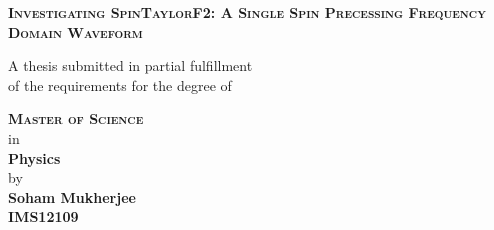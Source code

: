 \documentclass[12pt, a4wide]{report}
\begin{document}

\begin{titlepage}
\enlargethispage{10mm}
\begin{center}
\vspace*{10mm}

\textbf{\textsc{\LARGE Investigating SpinTaylorF2: A Single Spin Precessing Frequency Domain Waveform}}\\

\vspace*{10mm}

A thesis submitted in partial fulfillment \\ of the requirements for the degree of \\

\vspace{5mm}

\textbf{\textsc{\Large Master of Science}}\\
in \\
{\large \bf Physics} \\
\vspace{7mm}
{{by}} \\ \vspace{2mm}
{\textbf{\large Soham Mukherjee}}\\
{\textbf{IMS12109}}\\

\vspace*{6.5mm}


\end{center}
\end{titlepage}
\end{document}
